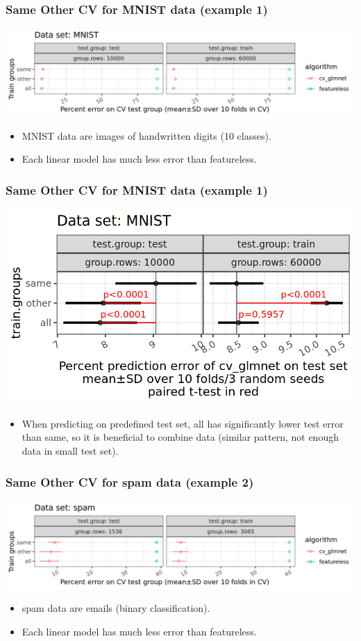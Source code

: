 \documentclass{beamer}
\begin{document}
\begin{frame}[fragile]
  \frametitle{Same Other CV for MNIST data (example 1)}
  \includegraphics[width=\textwidth]{MNIST_error_glmnet_featureless_mean_SD.png}
  \begin{itemize}
  \item MNIST data are images of handwritten digits (10 classes).
  \item Each linear model has much less error than featureless.
  \end{itemize}
\end{frame}

\begin{frame}
  \frametitle{Same Other CV for MNIST data (example 1)}
  \includegraphics[width=\textwidth]{MNIST_error_glmnet_sizes_mean_SD_pvalue.png}
  \begin{itemize}
  \item When predicting on predefined test set, all has significantly
    lower test error than same, so it is beneficial to combine data
    (similar pattern, not enough data in small test set).
  \end{itemize}
\end{frame}

\begin{frame}[fragile]
  \frametitle{Same Other CV for spam data (example 2)}
  \includegraphics[width=\textwidth]{spam_error_glmnet_featureless_mean_SD.png}
  \begin{itemize}
  \item spam data are emails (binary classification).
  \item Each linear model has much less error than featureless.
  \end{itemize}
\end{frame}
\end{document}
